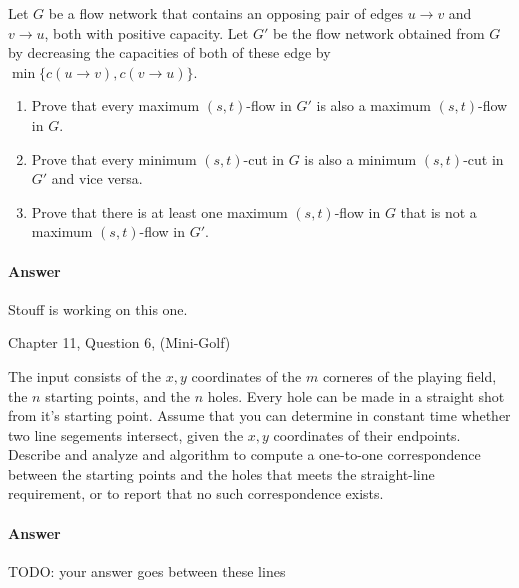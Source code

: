 \documentclass{article}
\begin{document}
Let $G$ be a flow network that contains an opposing pair of edges $u \to v$ and $v \to u$, both with positive capacity.
Let $G'$ be the flow network obtained from $G$ by decreasing the capacities of both of these edge by $\min \{ c(u \to v), c(v \to u) \}$.

\begin{enumerate}[label=(\alph*)]
    \item Prove that every maximum $(s,t)$-flow in $G'$ is also a maximum $(s,t)$-flow in $G$.
    \item Prove that every minimum $(s,t)$-cut in $G$ is also a minimum $(s,t)$-cut in $G'$ and vice versa.
    \item Prove that there is at least one maximum $(s,t)$-flow in $G$ that is not a maximum $(s,t)$-flow in $G'$.
\end{enumerate}

\paragraph{Answer}


Stouff is working on this one.


\nextprob
{}

Chapter 11, Question 6, (Mini-Golf)

The input consists of the $x,y$ coordinates of the $m$ corneres of the playing field, the $n$ starting points, and the $n$ holes.
Every hole can be made in a straight shot from it's starting point.
Assume that you can determine in constant time whether two line segements intersect, given the $x,y$ coordinates of their endpoints.
Describe and analyze and algorithm to compute a one-to-one correspondence between the starting points and the holes that meets the straight-line requirement, or to report that no such correspondence exists.

\paragraph{Answer}


TODO: your answer goes between these lines

\end{document}
